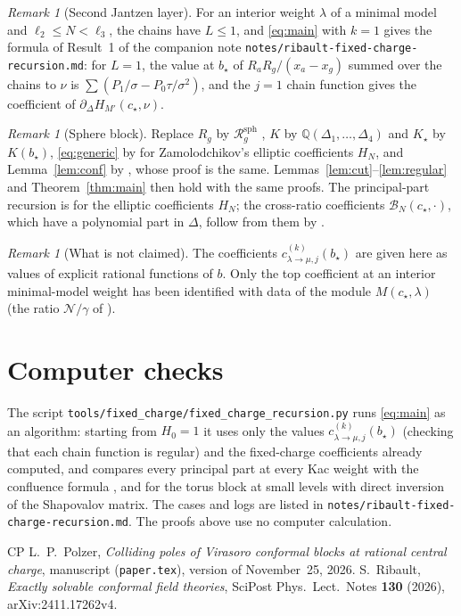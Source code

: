 \documentclass[11pt]{article}
\theoremstyle{definition}
\theoremstyle{remark}
\newtheorem{remark}[theorem]{Remark}
\begin{document}
\begin{remark}[Second Jantzen layer]
For an interior weight $\lambda$ of a minimal model and
$\ell_2\le N<\ell_3$, the chains have $L\le1$, and \eqref{eq:main} with $k=1$
gives the formula of Result~1 of the companion note
\texttt{notes/ribault-fixed-charge-recursion.md}: for $L=1$, the value at
$b_\star$ of $R_aR_{g}/(x_a-x_g)$ summed over the chains to $\nu$ is
$\sum(P_1/\sigma-P_0\tau/\sigma^2)$, and the $j=1$ chain function gives the
coefficient of $\partial_\Delta H_{M'}(c_\star,\nu)$.
\end{remark}

\begin{remark}[Sphere block]\label{rem:sphere}
Replace $R_g$ by $\mathcal R^{\mathrm{sph}}_g$ \cite[Definition~12.1]{CP}, $K$ by
$\mathbb Q(\Delta_1,\dots,\Delta_4)$ and $K_\star$ by $K(b_\star)$, \eqref{eq:generic} by
\cite[Proposition~12.4]{CP} for Zamolodchikov's elliptic coefficients $H_N$,
and Lemma~\ref{lem:conf} by \cite[Theorem~12.6]{CP}, whose proof is the same.
Lemmas~\ref{lem:cut}--\ref{lem:regular} and Theorem~\ref{thm:main} then hold
with the same proofs.  The principal-part recursion is for the elliptic
coefficients $H_N$; the cross-ratio coefficients $\mathcal B_N(c_\star,\cdot)$,
which have a polynomial part in $\Delta$, follow from them by
\cite[(11.5)]{CP}.
\end{remark}

\begin{remark}[What is not claimed]
The coefficients $c^{(k)}_{\lambda\to\mu,j}(b_\star)$ are given here as values of
explicit rational functions of $b$.  Only the top coefficient at an interior
minimal-model weight has been identified with data of the module
$M(c_\star,\lambda)$ (the ratio $\mathcal N/\gamma$ of
\cite[Theorem~8.2]{CP}).
\end{remark}

\section{Computer checks}

The script \texttt{tools/fixed\_charge/fixed\_charge\_recursion.py} runs
\eqref{eq:main} as an algorithm: starting from $H_0=1$ it uses only the values
$c^{(k)}_{\lambda\to\mu,j}(b_\star)$ (checking that each chain function is
regular) and the fixed-charge coefficients already computed, and compares every
principal part at every Kac weight with the confluence formula
\cite[Theorems~7.3 and~12.6]{CP}, and for the torus block at small levels with
direct inversion of the Shapovalov matrix.  The cases and logs are listed in
\texttt{notes/ribault-fixed-charge-recursion.md}.  The proofs above use no
computer calculation.

\begin{thebibliography}{CP}
 L.~P.~Polzer, \emph{Colliding poles of Virasoro conformal blocks
at rational central charge}, manuscript (\texttt{paper.tex}), version of
November~25, 2026.
 S.~Ribault, \emph{Exactly solvable conformal field
theories}, SciPost Phys.\ Lect.\ Notes \textbf{130} (2026), arXiv:2411.17262v4.
\end{thebibliography}
\end{document}
